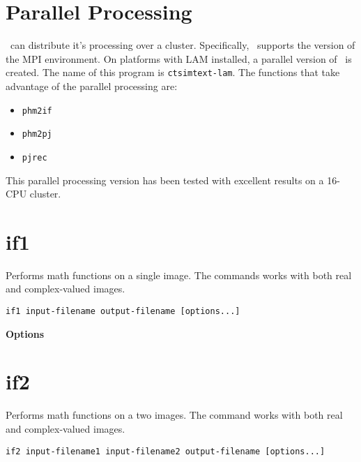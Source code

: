 \section{Parallel Processing}\label{ctsimtextlam}
\ctsimtext\ can distribute it's processing over a cluster. Specifically,
\ctsimtext\ supports the  version of
the MPI environment. On platforms with LAM installed, a parallel version of
\ctsimtext\ is created. The name of this program is \texttt{ctsimtext-lam}.
The functions that take advantage of the parallel processing are:

\begin{itemize}\itemsep=0pt
\item \texttt{phm2if}
\item \texttt{phm2pj}
\item \texttt{pjrec}
\end{itemize}

This parallel processing version has been tested with excellent results on
a 16-CPU  cluster.


\section{if1}\label{if1}%
Performs math functions on a single image. The commands works with
both real and complex-valued images.

\usage
\texttt{if1 input-filename output-filename [options...]}

\textbf{Options}

\begin{twocollist}
\end{twocollist}

\section{if2}\label{if2}%
Performs math functions on a two images. The command works with both
real and complex-valued images.

\usage
\texttt{if2 input-filename1 input-filename2 output-filename [options...]}

